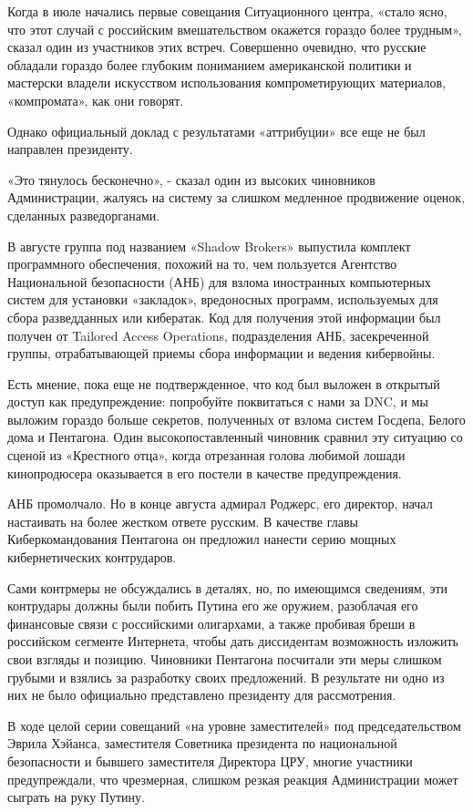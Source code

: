 Когда в июле начались первые совещания Ситуационного центра, «стало
ясно, что этот случай с российским вмешательством окажется гораздо более
трудным», сказал один из участников этих встреч. Совершенно очевидно,
что русские обладали гораздо более глубоким пониманием американской
политики и мастерски владели искусством использования компрометирующих
материалов, «компромата», как они говорят.

Однако официальный доклад с результатами «аттрибуции» все еще не был
направлен президенту.

«Это тянулось бесконечно», - сказал один из высоких чиновников
Администрации, жалуясь на систему за слишком медленное продвижение
оценок, сделанных разведорганами.

В августе группа под названием «Shadow Brokers» выпустила комплект
программного обеспечения, похожий на то, чем пользуется Агентство
Национальной безопасности (АНБ) для взлома иностранных компьютерных
систем для установки «закладок», вредоносных программ, используемых для
сбора разведданных или кибератак. Код для получения этой информации был
получен от Tailored Access Operations, подразделения АНБ, засекреченной
группы, отрабатывающей приемы сбора информации и ведения кибервойны.

Есть мнение, пока еще не подтвержденное, что код был выложен в открытый
доступ как предупреждение: попробуйте поквитаться с нами за DNC, и мы
выложим гораздо больше секретов, полученных от взлома систем Госдепа,
Белого дома и Пентагона. Один высокопоставленный чиновник сравнил эту
ситуацию со сценой из «Крестного отца», когда отрезанная голова любимой
лошади кинопродюсера оказывается в его постели в качестве
предупреждения.

АНБ промолчало. Но в конце августа адмирал Роджерс, его директор, начал
настаивать на более жестком ответе русским. В качестве главы
Киберкомандования Пентагона он предложил нанести серию мощных
кибернетических контрударов.

Сами контрмеры не обсуждались в деталях, но, по имеющимся сведениям, эти
контрудары должны были побить Путина его же оружием, разоблачая его
финансовые связи с российскими олигархами, а также пробивая бреши в
российском сегменте Интернета, чтобы дать диссидентам возможность
изложить свои взгляды и позицию. Чиновники Пентагона посчитали эти меры
слишком грубыми и взялись за разработку своих предложений. В результате
ни одно из них не было официально представлено президенту для
рассмотрения.

В ходе целой серии совещаний «на уровне заместителей» под
председательством Эврила Хэйанса, заместителя Советника президента по
национальной безопасности и бывшего заместителя Директора ЦРУ, многие
участники предупреждали, что чрезмерная, слишком резкая реакция
Администрации может сыграть на руку Путину.


